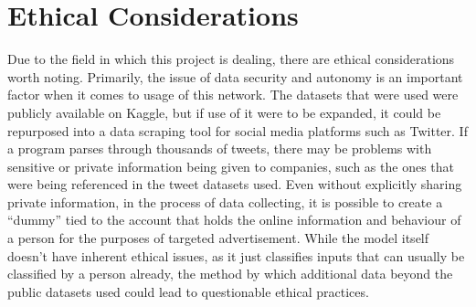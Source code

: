 \section{Ethical Considerations}
Due to the field in which this project is dealing, there are ethical considerations worth noting. Primarily, the issue of data security and autonomy is an important factor when it comes to usage of this network. The datasets that were used were publicly available on Kaggle, but if use of it were to be expanded, it could be repurposed into a data scraping tool for social media platforms such as Twitter. If a program parses through thousands of tweets, there may be problems with sensitive or private information being given to companies, such as the ones that were being referenced in the tweet datasets used. Even without explicitly sharing private information, in the process of data collecting, it is possible to create a “dummy” tied to the account that holds the online information and behaviour of a person for the purposes of targeted advertisement. While the model itself doesn’t have inherent ethical issues, as it just classifies inputs that can usually be classified by a person already, the method by which additional data beyond the public datasets used could lead to questionable ethical practices.